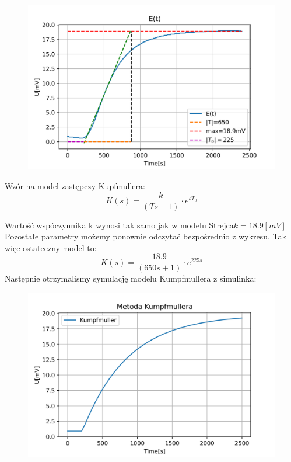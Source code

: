\documentclass{article}
\begin{document}
\begin{figure}[h!]
    \centering
    \includegraphics[scale=0.7]{oryginal_z_kreskami.png}
\end{figure}

Wzór na model zastępczy Kupfmullera:
$$ K\left(s\right)=\frac{k}{\left(Ts+1\right)}\cdot e^{sT_{0}} $$



Wartość wspóczynnika k wynosi tak samo jak w modelu Strejca$k=18.9[mV]$
Pozostałe parametry możemy ponownie
odczytać bezpośrednio z wykresu.
Tak więc ostateczny model to:
$$ K\left(s\right)=\frac{18.9}{\left(650s+1\right)}\cdot e^{225s} $$
\newpage
Następnie otrzymalismy symulację modelu Kumpfmullera z simulinka:



\begin{figure}[h!]
    \centering
    \includegraphics[scale=0.7]{metoda_kumpfmullera.png}
\end{figure}
\end{document}
